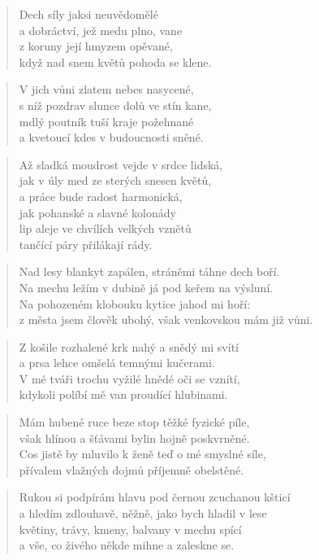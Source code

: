 \documentclass{book}
\begin{document}
\newpage
{}
\begin{verse}
Dech síly jaksi neuvědomělé\\
a dobráctví, jež medu plno, vane\\
z koruny její hmyzem opěvané,\\
když nad snem květů pohoda se klene.
\end{verse}
\begin{verse}
V jich vůni zlatem nebes nasycené,\\
s níž pozdrav slunce dolů ve stín kane,\\
mdlý poutník tuší kraje požehnané\\
a kvetoucí kdes v budoucnosti sněné.
\end{verse}
\begin{verse}
Až sladká moudrost vejde v srdce lidská,\\
jak v úly med ze sterých snesen květů,\\
a práce bude radost harmonická,\\
jak pohanské a slavné kolonády\\
lip aleje ve chvílích velkých vznětů\\
tančící páry přilákají rády.
\end{verse}
\newpage
{}
\begin{verse}
Nad lesy blankyt zapálen, stráněmi táhne dech boří.\\
Na mechu ležím v dubině já pod keřem na výsluní.\\
Na pohozeném klobouku kytice jahod mi hoří:\\
z města jsem člověk ubohý, však venkovskou mám již vůni.
\end{verse}
\begin{verse}
Z košile rozhalené krk nahý a snědý mi svítí\\
a prsa lehce omšelá temnými kučerami.\\
V mé tváři trochu vyžilé hnědé oči se vznítí,\\
kdykoli políbí mě van proudící hlubinami.
\end{verse}
\begin{verse}
Mám hubené ruce beze stop těžké fyzické píle,\\
však hlínou a šťávami bylin hojně poskvrněné.\\
Cos jistě by mluvilo k ženě teď o mé smyslné síle,\\
přívalem vlažných dojmů příjemně obelstěné.
\end{verse}
\begin{verse}
Rukou si podpírám hlavu pod černou zcuchanou kšticí\\
a hledím zdlouhavě, něžně, jako bych hladil v lese\\
květiny, trávy, kmeny, balvany v mechu spící\\
a vše, co živého někde mihne a zaleskne se.
\end{verse}
\end{document}
